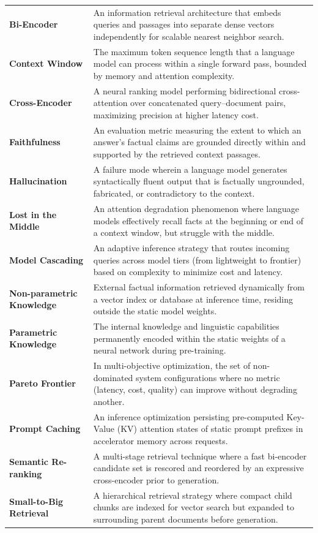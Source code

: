 \begin{tabular}{lp{8.8cm}}
\textbf{Bi-Encoder}             & An information retrieval architecture that embeds queries and passages into separate dense vectors independently for scalable nearest neighbor search. \\
\textbf{Context Window}         & The maximum token sequence length that a language model can process within a single forward pass, bounded by memory and attention complexity. \\
\textbf{Cross-Encoder}          & A neural ranking model performing bidirectional cross-attention over concatenated query--document pairs, maximizing precision at higher latency cost. \\
\textbf{Faithfulness}           & An evaluation metric measuring the extent to which an answer's factual claims are grounded directly within and supported by the retrieved context passages. \\
\textbf{Hallucination}          & A failure mode wherein a language model generates syntactically fluent output that is factually ungrounded, fabricated, or contradictory to the context. \\
\textbf{Lost in the Middle}     & An attention degradation phenomenon where language models effectively recall facts at the beginning or end of a context window, but struggle with the middle. \\
\textbf{Model Cascading}        & An adaptive inference strategy that routes incoming queries across model tiers (from lightweight to frontier) based on complexity to minimize cost and latency. \\
\textbf{Non-parametric Knowledge} & External factual information retrieved dynamically from a vector index or database at inference time, residing outside the static model weights. \\
\textbf{Parametric Knowledge}   & The internal knowledge and linguistic capabilities permanently encoded within the static weights of a neural network during pre-training. \\
\textbf{Pareto Frontier}        & In multi-objective optimization, the set of non-dominated system configurations where no metric (latency, cost, quality) can improve without degrading another. \\
\textbf{Prompt Caching}         & An inference optimization persisting pre-computed Key-Value (KV) attention states of static prompt prefixes in accelerator memory across requests. \\
\textbf{Semantic Re-ranking}    & A multi-stage retrieval technique where a fast bi-encoder candidate set is rescored and reordered by an expressive cross-encoder prior to generation. \\
\textbf{Small-to-Big Retrieval} & A hierarchical retrieval strategy where compact child chunks are indexed for vector search but expanded to surrounding parent documents before generation. \\
\end{tabular}
